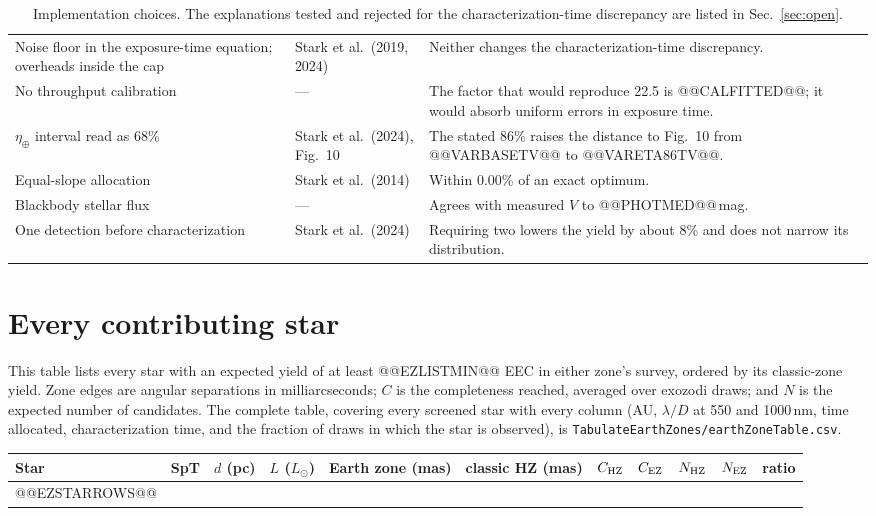 \documentclass[11pt,a4paper]{article}
\begin{document}
\begin{table}[htbp]
\begin{tabular}{p{4.2cm}p{3.6cm}p{7.4cm}}
Noise floor in the exposure-time equation; overheads inside the cap & Stark et al.\ (2019, 2024) & Neither changes the characterization-time discrepancy. \\
No throughput calibration & --- & The factor that would reproduce 22.5 is @@CALFITTED@@; it would absorb uniform errors in exposure time. \\
$\eta_\oplus$ interval read as 68\% & Stark et al.\ (2024), Fig.~10 & The stated 86\% raises the distance to Fig.~10 from @@VARBASETV@@ to @@VARETA86TV@@. \\
Equal-slope allocation & Stark et al.\ (2014) & Within 0.00\% of an exact optimum. \\
Blackbody stellar flux & --- & Agrees with measured $V$ to @@PHOTMED@@\,mag. \\
One detection before characterization & Stark et al.\ (2024) & Requiring two lowers the yield by about 8\% and does not narrow its distribution. \\
\bottomrule
\end{tabular}
\caption{Implementation choices. The explanations tested and rejected for the
characterization-time discrepancy are listed in Sec.~\ref{sec:open}.}
\label{tab:choices}
\end{table}

\clearpage
\section{Every contributing star}
\label{app:stars}

This table lists every star with an expected yield of at least @@EZLISTMIN@@ EEC in either
zone's survey, ordered by its classic-zone yield. Zone edges are angular separations in
milliarcseconds; $C$ is the completeness reached, averaged over exozodi draws; and $N$ is the
expected number of candidates. The complete table, covering every screened star with every column
(AU, $\lambda/D$ at 550 and 1000\,nm, time allocated, characterization time, and the fraction of
draws in which the star is observed), is \texttt{TabulateEarthZones/earthZoneTable.csv}.

{\scriptsize
\setlength{\tabcolsep}{3pt}
\begin{longtable}{llrrrrrrrrr}
\toprule
\textbf{Star} & \textbf{SpT} & \textbf{$d$ (pc)} & \textbf{$L$ ($L_\odot$)} & \textbf{Earth zone (mas)} & \textbf{classic HZ (mas)} & \textbf{$C_{\rm HZ}$} & \textbf{$C_{\rm EZ}$} & \textbf{$N_{\rm HZ}$} & \textbf{$N_{\rm EZ}$} & \textbf{ratio} \\
\midrule
\endhead
@@EZSTARROWS@@
\bottomrule
\end{longtable}
}
\end{document}

